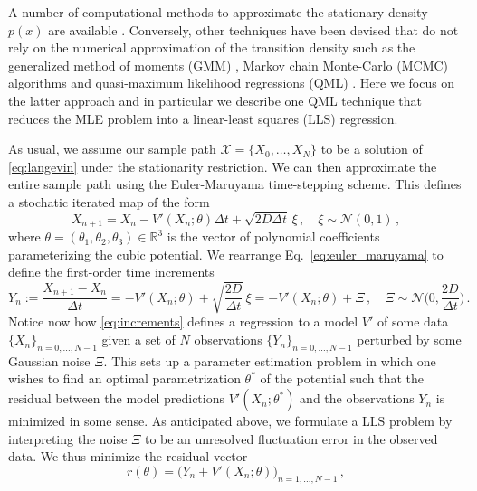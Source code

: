 \documentclass[10pt]{article}
\begin{document}
A number of computational methods to approximate the stationary density $p(x)$ are available \cite{Pedersen1995, Jensen2002, Sahalia2002}.
Conversely, other techniques have been devised that do not rely on the numerical approximation of the transition density such as the generalized method of moments (GMM) \cite{Hansen1982}, Markov chain Monte-Carlo (MCMC) algorithms \cite{Roberts2001,Alexander2005} and quasi-maximum likelihood regressions (QML) \cite{Castelle1986, Yoshida1992}.
Here we focus on the latter approach and in particular we describe one QML technique that reduces the MLE problem into a linear-least squares (LLS) regression.

As usual, we assume our sample path $\mathcal{X} = \{X_{0},\dots,X_{N}\}$ to be a solution of \eqref{eq:langevin} under the stationarity restriction.
We can then approximate the entire sample path using the Euler-Maruyama time-stepping scheme.
This defines a stochatic iterated map of the form
%
\begin{equation}\label{eq:euler_maruyama}
        X_{n+1} = X_{n} -V'(X_{n};\theta)\Delta t + \sqrt{2D\Delta t}\,\xi\,,\quad \xi\sim\mathcal{N}(0,1)\,,
\end{equation}
%
where $\theta=(\theta_1,\theta_2,\theta_3)\in\mathbb{R}^{3}$ is the vector of polynomial coefficients parameterizing the cubic potential.
We rearrange Eq.~\eqref{eq:euler_maruyama} to define the first-order time increments
%
\begin{equation}\label{eq:increments}
        Y_{n} := \frac{X_{n+1} - X_{n}}{\Delta t} = -V'(X_{n};\theta) + \sqrt{\frac{2D}{\Delta t}}\,\xi = -V'(X_{n};\theta) + \Xi\,,\quad\Xi\sim\mathcal{N}\bigg(0,\frac{2D}{\Delta t}\bigg)\,.
\end{equation}
%
Notice now how \eqref{eq:increments} defines a regression to a model $V'$ of some data $\{X_{n}\}_{n=0,\dots,N-1}$ given a set of $N$ observations $\{Y_{n}\}_{n=0,\dots,N-1}$ perturbed by some Gaussian noise $\Xi$.
This sets up a parameter estimation problem in which one wishes to find an optimal parametrization $\theta^*$ of the potential such that the residual between the model predictions $V'(X_{n};\theta^*)$ and the observations $Y_{n}$ is minimized in some sense.
As anticipated above, we formulate a LLS problem by interpreting the noise $\Xi$ to be an unresolved fluctuation error in the observed data.
We thus minimize the residual vector
\begin{equation}\label{eq:residual}
        r(\theta) = \big(Y_{n} + V'(X_{n};\theta)\big)_{n=1,\dots,N-1}\,,
\end{equation}
\end{document}
